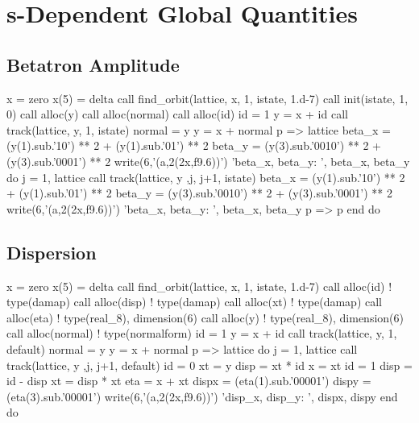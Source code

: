 \section{s-Dependent Global Quantities}

\subsection{Betatron Amplitude}

\begin{ptccode}
x = zero
x(5) = delta
call find_orbit(lattice, x, 1, istate, 1.d-7)
call init(istate, 1, 0)
call alloc(y)
call alloc(normal)
call alloc(id)
id = 1
y = x + id
call track(lattice, y, 1, istate)
normal = y
y = x + normal%
p => lattice%
beta_x = (y(1).sub.'10') ** 2   + (y(1).sub.'01') ** 2
beta_y = (y(3).sub.'0010') ** 2 + (y(3).sub.'0001') ** 2
write(6,'(a,2(2x,f9.6))') 'beta_x, beta_y: ', beta_x, beta_y
do j = 1, lattice%
  call track(lattice, y ,j, j+1, istate)
  beta_x = (y(1).sub.'10') ** 2   + (y(1).sub.'01') ** 2
  beta_y = (y(3).sub.'0010') ** 2 + (y(3).sub.'0001') ** 2
  write(6,'(a,2(2x,f9.6))') 'beta_x, beta_y: ', beta_x, beta_y
  p => p%
end do
\end{ptccode}





\subsection{Dispersion}

\begin{ptccode}
x = zero
x(5) = delta
call find_orbit(lattice, x, 1, istate, 1.d-7)
call alloc(id)      ! type(damap)
call alloc(disp)    ! type(damap)
call alloc(xt)      ! type(damap)
call alloc(eta)     ! type(real_8), dimension(6)
call alloc(y)       ! type(real_8), dimension(6)
call alloc(normal)  ! type(normalform)
id = 1
y = x + id
call track(lattice, y, 1, default)
normal = y
y = x + normal%
p => lattice%
do j = 1, lattice%
  call track(lattice, y ,j, j+1, default)
  id = 0
  xt = y
  disp = xt * id
  x = xt
  id = 1
  disp = id - disp
  xt = disp * xt
  eta = x + xt
  dispx = (eta(1).sub.'00001')
  dispy = (eta(3).sub.'00001')
  write(6,'(a,2(2x,f9.6))') 'disp_x, disp_y: ', dispx, dispy
end do
\end{ptccode}


